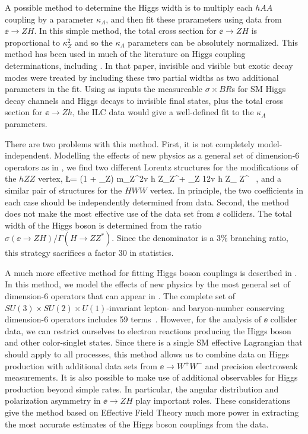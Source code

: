 A possible method to determine the Higgs width is to multiply each $hAA$ coupling by a parameter $\kappa_A$, and then fit these prarameters using data from $\ee\to ZH$.   In this simple method, the total cross section for $\ee\to ZH$ is proportional to $\kappa_Z^2$ and so the $\kappa_A$ parameters can be absolutely normalized.   This method has been used in much of the literature on Higgs coupling determinations, including \cite{Fujii:2015jha}.  In that paper, invisible and visible but exotic decay modes were treated by including these two partial widths as two additional parameters in the fit.  Using as inputs the measureable $\sigma\times BR$s for SM Higgs decay channels and Higgs decays to invisible final states, plus the total cross section for $\ee\to Zh$,  the ILC data would give a well-defined fit to the $\kappa_A$ parameters.

There are two problems with this method.  First, it is not completely model-independent.  Modelling the effects of new physics as a general set of dimension-6 operators as in , we find two different Lorentz structures for the modifications of the $hZZ$ vertex,
\beq
   \Delta \L =    (1 + \eta_Z) {m_Z^2\over v}  h Z_\mu Z^\mu + \zeta_Z {1\over 2v} h
   Z_{\mu\nu} Z^{\mu\nu} \ ,
and a similar pair of structures for the $HWW$ vertex.  In principle, the two coefficients  in each case should be independently determined from data.  Second, the method does not make the most effective use of the data set from $\ee$ colliders.  The total width of the Higgs boson is determined from the ratio  $\sigma(\ee\to ZH)/\Gamma(H\to ZZ^*)$.  Since the denominator is a 3\% branching ratio, this strategy sacrifices a factor 30 in 
statistics.

A much more effective method for fitting Higgs boson couplings is described in \cite{Barklow:2017suo}.   In this method, we model the effects of new physics by the most general set of dimension-6 operators that can appear in .  The complete set of $SU(3)\times SU(2)\times U(1)$-invariant lepton- and baryon-number conserving dimension-6 operators  includes 59 terms~\cite{Grzadkowski:2010es}.  However, for 
the analysis of $\ee$ collider data, we can restrict ourselves to electron reactions 
producing the Higgs boson and other color-singlet states.  Since there is a single SM effective
 Lagrangian that should apply to all processes, this method allows us to combine data on 
Higgs production with additional data sets from $\ee\to W^+W^-$ and precision electroweak
measurements.   It is also possible to make use of additional observables for Higgs production
beyond simple rates.  In particular, the angular distribution and polarization asymmetry in 
$\ee\to ZH$ play important roles.  These considerations give the method based on 
Effective Field Theory much more power in extracting the most accurate estimates of the 
Higgs boson couplings from the data.


